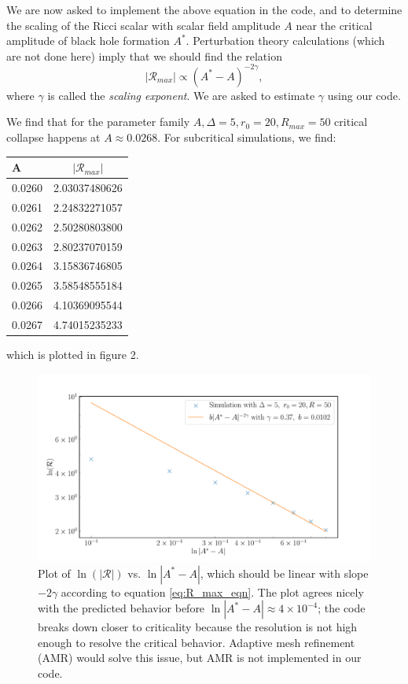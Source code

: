 \documentclass[12pt]{article}
\numberwithin{equation}{section}
\begin{document}
We are now asked to implement the above equation in the code, and to determine the scaling of the Ricci scalar with scalar field amplitude $A$ near the critical amplitude of black hole formation $A^*$.  Perturbation theory calculations (which are not done here) imply that we should find the relation
\begin{equation} \label{eq:R_max_eqn}
|\mathcal{R}_{max}| \propto (A^* - A)^{-2 \gamma},
\end{equation}
where $\gamma$ is called the \textit{scaling exponent}.  We are asked to estimate $\gamma$ using our code.

We find that for the parameter family $A, \Delta = 5, r_0 = 20, R_{max}=50$ critical collapse happens at $A \approx 0.0268$.  For subcritical simulations, we find:
\begin{center}
\begin{tabular}{ l | c }
	A & $|\mathcal{R}_{max}|$ \\
	\hline
	\hline
	0.0260 & 2.03037480626 \\
	0.0261 & 2.24832271057 \\
	0.0262 & 2.50280803800 \\
	0.0263 & 2.80237070159 \\
	0.0264 & 3.15836746805 \\
	0.0265 & 3.58548555184 \\
	0.0266 & 4.10369095544 \\
	0.0267 & 4.74015235233  
\end{tabular}
\end{center}
which is plotted in figure 2.

\begin{figure}
	\includegraphics[width=\textwidth]{ricci_scalar_fig.pdf}
	\caption{Plot of $\ln(|\mathcal{R}|)$ vs. $\ln|A^*-A|$, which should be linear with slope $-2\gamma$ according to equation \ref{eq:R_max_eqn}.  The plot agrees nicely with the predicted behavior before $\ln|A^*-A| \approx 4 \times 10^{-4}$; the code breaks down closer to criticality because the resolution is not high enough to resolve the critical behavior.  Adaptive mesh refinement (AMR) would solve this issue, but AMR is not implemented in our code.}
\end{figure}
\end{document}
